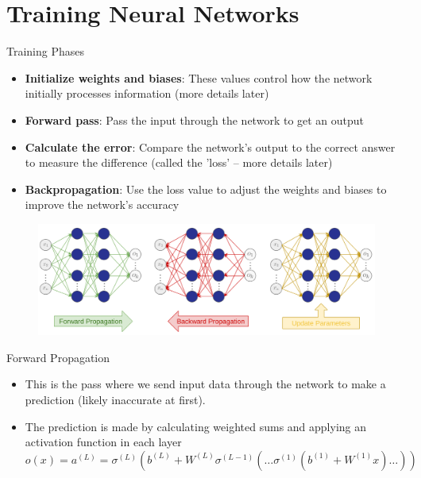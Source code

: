 \documentclass[serif, aspectratio=169]{beamer}
\begin{document}
\section{Training Neural Networks}
\begin{frame}{Training Phases}
    \begin{itemize}
        \item \textbf{Initialize weights and biases}: These values control how the network initially processes information (more details later)
        \item \textbf{Forward pass}: Pass the input through the network to get an output
        \item \textbf{Calculate the error}: Compare the network's output to the correct answer to measure the difference (called the 'loss' -- more details later) 
        \item \textbf{Backpropagation}: Use the loss value to adjust the weights and biases to improve the network's accuracy
    \end{itemize}
    \begin{figure}[bh]
            \includegraphics[keepaspectratio, scale=0.2]{pic/4/training-phases.png}
    \end{figure}
\end{frame}

\begin{frame}[t]{Forward Propagation}
    \begin{itemize}
        \item This is the pass where we send input data through the network to make a prediction (likely inaccurate at first).
        \item The prediction is made by calculating weighted sums and applying an activation function in each layer
        $$ o(x) = a^{(L)} = \sigma^{(L)}\left( b^{(L)} + W^{(L)}  \sigma^{(L-1)}\left( \ldots \sigma^{(1)}(b^{(1)} + W^{(1)}  x)  \ldots \right) \right) $$
    \end{itemize}
\end{frame}
\end{document}
